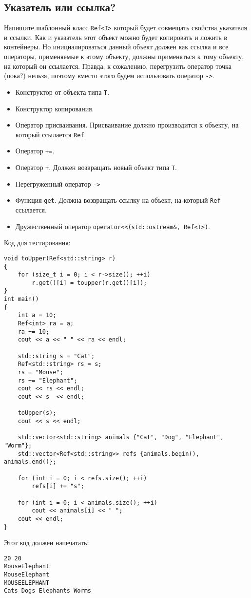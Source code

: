 \documentclass{article}
\begin{document}
\newpage
\subsection{Указатель или ссылка?}
Напишите шаблонный класс \texttt{Ref<T>} который будет совмещать свойства указателя и ссылки. Как и указатель этот объект можно будет копировать и ложить в контейнеры. Но инициалироваться данный объект должен как ссылка и все операторы, применяемые к этому объекту, должны применяться к тому объекту, на который он ссылается. Правда, к сожалению, перегрузить оператор точка (пока?) нельзя, поэтому вместо этого будем использовать оператор \texttt{->}.

\begin{itemize}
\item Конструктор от объекта типа \texttt{T}.
\item Конструктор копирования.
\item Оператор присваивания. Присваивание должно производится к объекту, на который ссылается \texttt{Ref}.
\item Оператор \texttt{+=}.
\item Оператор \texttt{+}. Должен возвращать новый объект типа \texttt{T}.
\item Перегруженный оператор \texttt{->}
\item Функция \texttt{get}. Должна возвращать ссылку на объект, на который \texttt{Ref} ссылается.
\item Дружественный оператор \texttt{operator<<(std::ostream\&, Ref<T>)}. 
\end{itemize}

Код для тестирования:
\begin{lstlisting}
void toUpper(Ref<std::string> r)
{
    for (size_t i = 0; i < r->size(); ++i)
        r.get()[i] = toupper(r.get()[i]);
}
int main()
{
    int a = 10;
    Ref<int> ra = a;
    ra += 10;
    cout << a << " " << ra << endl;

    std::string s = "Cat";
    Ref<std::string> rs = s;
    rs = "Mouse";
    rs += "Elephant";
    cout << rs << endl;
    cout << s  << endl;
    
    toUpper(s);
    cout << s << endl;

    std::vector<std::string> animals {"Cat", "Dog", "Elephant", "Worm"};
    std::vector<Ref<std::string>> refs {animals.begin(), animals.end()};

    for (int i = 0; i < refs.size(); ++i)
        refs[i] += "s";

    for (int i = 0; i < animals.size(); ++i)
        cout << animals[i] << " ";
    cout << endl;
}
\end{lstlisting}

\newpage
Этот код должен напечатать:
\begin{verbatim}
20 20
MouseElephant
MouseElephant
MOUSEELEPHANT
Cats Dogs Elephants Worms 
\end{verbatim}
\end{document}
